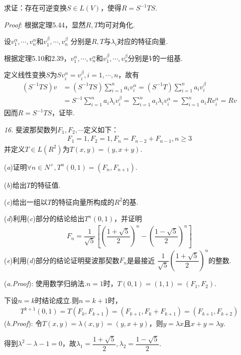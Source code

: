 求证：存在可逆变换\(S \in L(V)\)，使得\(R=S^{-1}TS\).

\textit{Proof}:
根据定理5.44，显然\(R,T\)均可对角化.

设\(v_1^\alpha,\cdots,v_n^\alpha\)和\(v_1^\beta,\cdots,v_n^\beta\)
分别是\(R,T\)与\(\lambda_i\)对应的特征向量.

根据定理5.10和2.39，\(v_1^\alpha,\cdots,v_n^\alpha\)和\(v_1^\beta,\cdots,v_n^\beta\)分别是\(V\)的一组基.

定义线性变换\(S\)为\(Sv_i^\alpha=v_i^\beta,i=1,\cdots,n\)，故有
    \begin{align*}
        (S^{-1}TS)v &=(S^{-1}TS)\sum_{i=1}^n a_iv_i^\alpha=(S^{-1}T)\sum_{i=1}^n a_iv_i^\beta \\
                    &=S^{-1}\sum_{i=1}^n a_i\lambda_i v_i^\beta=\sum_{i=1}^n a_i\lambda_i v_i^\alpha
                     =\sum_{i=1}^n a_iRv_i^\alpha=Rv
    \end{align*}
因而\(R=S^{-1}TS\)，证毕.

\newpage

\textit{16.}
{\kaishu 斐波那契数列}\(F_1,F_2,\cdots\)定义如下：
    \begin{align*}
        F_1=1,F_2=1,F_n=F_{n-2}+F_{n-1},n \geq 3
    \end{align*}
并定义\(T \in L(R^2)\)为\(T(x,y)=(y,x+y)\).

(\textit{a})证明\(\forall n \in N^+,T^n(0,1)=(F_n,F_{n+1})\).

(\textit{b})给出\(T\)的特征值.

(\textit{c})给出一组以\(T\)的特征向量所构成的\(R^2\)的基.

(\textit{d})利用(\textit{c})部分的结论给出\(T^n(0,1)\)，并证明
    \begin{align*}
        F_n=\dfrac{1}{\sqrt{5}}[(\dfrac{1+\sqrt{5}}{2})^n-(\dfrac{1-\sqrt{5}}{2})^n]
    \end{align*}
(\textit{e})利用(\textit{d})部分的结论证明{\kaishu 斐波那契数}\(F_n\)是最接近
\(\dfrac{1}{\sqrt{5}}(\dfrac{1+\sqrt{5}}{2})^n\)的整数.

(\textit{a.Proof}):
使用数学归纳法.\(n=1\)时，\(T(0,1)=(1,1)=(F_1,F_2)\).

下设\(n=k\)时结论成立.则\(n=k+1\)时，
    \begin{align*}
        T^{k+1}(0,1)=T(F_k,F_{k+1})=(F_{k+1},F_k+F_{k+1})=(F_{k+1},F_{k+2})
    \end{align*}
(\textit{b.Proof}):
令\(T(x,y)=\lambda(x,y)=(y,x+y)\)，则\(y=\lambda x\)且\(x+y=\lambda y\).

得到\(\lambda^2-\lambda-1=0\)，故\(\lambda_1=\dfrac{1+\sqrt{5}}{2},\lambda_2=\dfrac{1-\sqrt{5}}{2}\).

